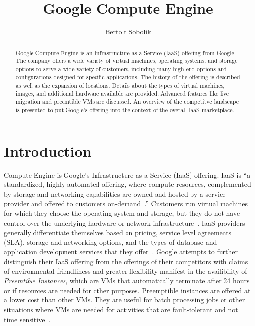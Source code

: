 
\title{Google Compute Engine}


\author{Bertolt Sobolik}

\renewcommand{\shortauthors}{B. Sobolik}


\begin{abstract}
Google Compute Engine is an Infrastructure as a Service (IaaS)
offering from Google. The company offers a wide variety of virtual machines, operating systems, and storage options to serve a wide variety of customers, including many high-end options and configurations designed for specific applications. The history of the offering is described as well as the expansion of locations. Details about the types of virtual machines, images, and additional hardware available are provided. Advanced features like live migration and preemtible VMs are discussed. An overview of the competitve landscape is presented to put Google's offering into the context of the overall IaaS marketplace. 
\end{abstract}



\maketitle

\section{Introduction}
Compute Engine is Google's Infrastructure as a Service (IaaS)
offering. IaaS is ``a standardized, highly automated offering, where
compute resources, complemented by storage and networking capabilities
are owned and hosted by a service provider and offered to customers
on-demand~\cite{hid-sp18-419-gartneritglossaryiaas}.''  Customers run
virtual machines for which they choose the operating system and
storage, but they do not have control over the underlying hardware or
network infrastructure~\cite{hid-sp18-419-mell2011nist}. IaaS
providers generally differentiate themselves based on pricing, service
level agreements (SLA), storage and networking options, and the types
of database and application development services that they
offer~\cite{hid-sp18-419-perficientchoosingiaas}. Google attempts to
further distinguish their IaaS offering from the offerings of their
competitors with claims of environmental friendliness and greater
flexibility manifest in the availibility of \textit{Preemtible
Instances}, which are VMs that automatically terminate after 24 hours
or if resources are needed for other purposes. Preemptible instances
are offered at a lower cost than other VMs. They are useful for batch
processing jobs or other situations where VMs are needed for
activities that are fault-tolerant and not time
sensitive~\cite{hid-sp18-419-gce}.


